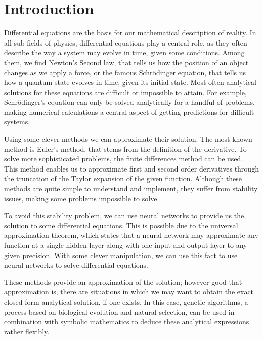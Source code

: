 \documentclass[aps,reprint,superscriptaddress,nofootinbib]{revtex4-2}
\begin{document}
\maketitle
\section{Introduction}

    Differential equations are the basis for our mathematical description of reality. In all sub-fields of physics, differential equations play a central role, as they often
    describe the way a system may evolve in time, given some conditions. %
    Among them, we find Newton's Second law, that tells us how the position of an object changes as we apply a force, or the famous Schrödinger equation, that tells us how a quantum state evolves in time, given its initial state. 
    Most often analytical solutions for these equations are difficult or impossible to attain. For example, Schrödinger's equation can only be solved analytically for a handful of problems, making numerical calculations a central aspect of getting predictions for difficult systems.
    
    Using some clever methods we can approximate their solution. The most known method is Euler's method, that stems %
    from the definition of the derivative.
    To solve more sophisticated problems, the finite differences method can be used.
    This method enables us to approximate first and second order derivatives through the truncation of the Taylor expansion of the given function. Although these methods are quite simple to understand and implement, they suffer from stability issues, making some problems impossible to solve.
    
    To avoid this stability problem, we can use neural networks to provide us the solution to some differential equations. This is possible due to the universal approximation theorem, which states that a neural network may approximate any function at a single hidden layer along with one input and output layer to any given precision. With some clever manipulation, we can use this fact to use neural networks to solve differential equations.
    
    These methods provide an approximation of the solution; however good that approximation is, there are situations in which we may want to obtain the exact closed-form analytical solution, if one exists. In this case, genetic algorithms, a process based on biological evolution and natural selection, can be used in combination with symbolic mathematics to deduce these analytical expressions rather flexibly.
    
\end{document}
